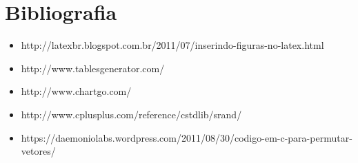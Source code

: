 \documentclass[a4paper,10pt]{article}
\begin{document}
 \section{Bibliografia}
 
\begin{itemize}
  \item  http://latexbr.blogspot.com.br/2011/07/inserindo-figuras-no-latex.html
  
  \item http://www.tablesgenerator.com/
  
  \item http://www.chartgo.com/
  
  \item http://www.cplusplus.com/reference/cstdlib/srand/
  
  \item https://daemoniolabs.wordpress.com/2011/08/30/codigo-em-c-para-permutar-vetores/
\end{itemize}
 
\end{document}
